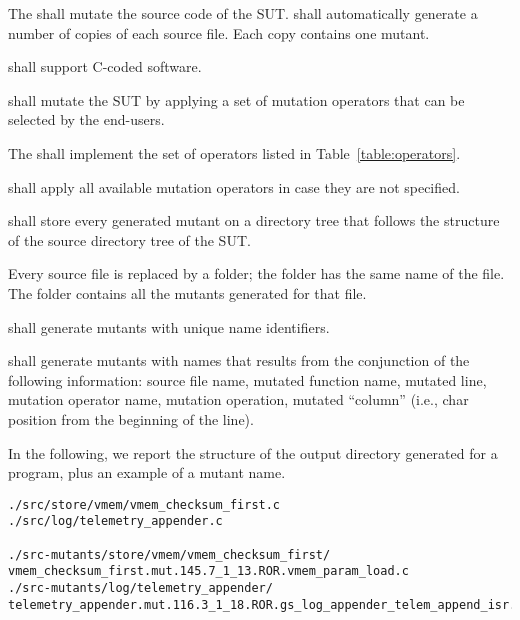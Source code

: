 
\RQ{} The \FAQAS shall mutate the source code of the SUT. \FAQAS shall automatically generate a number of copies of each source file. Each copy contains one mutant.


\RQ{} \FAQAS shall support C-coded software.

\RQ{} \FAQAS shall mutate the SUT by applying a set of mutation operators that can be selected by the end-users.

\RQ{} The \FAQAS shall implement the set of operators listed in Table~\ref{table:operators}.



\RQ{} \FAQAS shall apply all available mutation operators in case they are not specified.

\RQ{} \FAQAS shall store every generated mutant on a directory tree that follows the structure of the source directory tree of the SUT.

\remark Every source file is replaced by a folder; the folder has the same name of the file. The folder contains all the mutants generated for that file. 

\RQ{} \FAQAS shall generate mutants with unique name identifiers.

\RQ{} \FAQAS shall generate mutants with names that results from the conjunction of the following information:
source file name, mutated function name, mutated line, mutation operator name, mutation operation, mutated “column” (i.e., char position from the beginning of the line).

\remark In the following, we report the structure of the output directory generated for a program, plus an example of a mutant name.

\begin{verbatim}
./src/store/vmem/vmem_checksum_first.c
./src/log/telemetry_appender.c

./src-mutants/store/vmem/vmem_checksum_first/
vmem_checksum_first.mut.145.7_1_13.ROR.vmem_param_load.c
./src-mutants/log/telemetry_appender/
telemetry_appender.mut.116.3_1_18.ROR.gs_log_appender_telem_append_isr.c
\end{verbatim}

